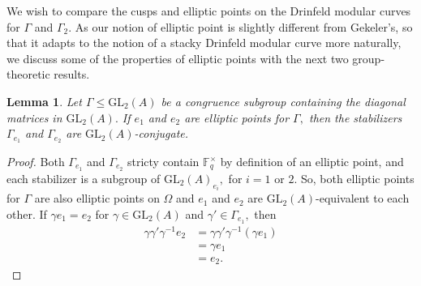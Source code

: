 \documentclass[11pt]{amsart}
\newtheorem{lemma}[theorem]{Lemma}
\theoremstyle{definition}
\numberwithin{equation}{section}
\newcommand{\GL}{\mathrm{GL}} 	%
\newcommand{\bbF}{\mathbb{F}}		%
\begin{document}
		We wish to compare the cusps and elliptic points on the Drinfeld modular curves for $\Gamma$ and $\Gamma_2.$ As our notion of elliptic point is slightly different from Gekeler's, so that it adapts to the notion of a stacky Drinfeld modular curve more naturally, we discuss some of the properties of elliptic points with the next two group-theoretic results. 
		\begin{lemma}\label{l: stabilizers are conjugate}
				Let $\Gamma\leq \GL_2(A)$ be a congruence subgroup containing the diagonal matrices in $\GL_2(A).$
				If $e_1$ and $e_2$ are elliptic points for $\Gamma,$ then the stabilizers $\Gamma_{e_1}$ and $\Gamma_{e_2}$ are $\GL_2(A)$-conjugate. 
		\end{lemma}
		\begin{proof}
			Both $\Gamma_{e_1}$ and $\Gamma_{e_2}$ stricty contain $\bbF_q^{\times}$ by definition of an elliptic point, and each stabilizer is a subgroup of $\GL_2(A)_{e_i},$ for $i=1$ or $2.$ So, both elliptic points for $\Gamma$ are also elliptic points on $\Omega$ and $e_1$ and $e_2$ are $\GL_2(A)$-equivalent to each other. If $\gamma e_1=e_2$ for $\gamma\in \GL_2(A)$ and $\gamma'\in \Gamma_{e_1},$ then 
			\[\begin{array}{rl}
				\gamma\gamma'\gamma^{-1}e_2&=\gamma\gamma'\gamma^{-1}(\gamma e_1)\\&=\gamma e_1\\
				&=e_2.
			\end{array} \] 
		\end{proof}
		
\end{document}
